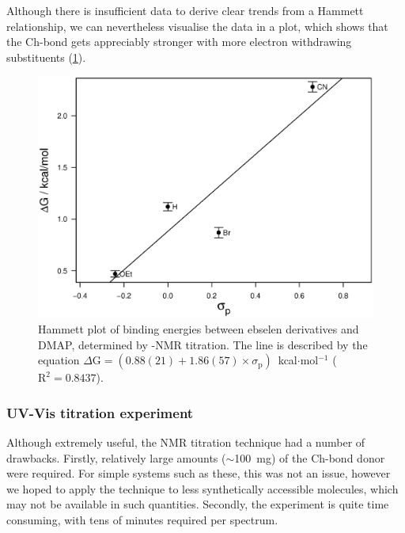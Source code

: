 \begin{refsection}
Although there is insufficient data to derive clear trends from a Hammett relationship, we can nevertheless visualise the data in a plot, which shows that the Ch-bond gets appreciably stronger with more electron withdrawing substituents (\cref{fig:hammett-dmap-nmr}).

\begin{figure}
    \centering
    \includegraphics[width=0.9\linewidth]{Figures/hammett-nmr-p.eps}
    \caption[Hammett plot of binding energies between ebselen derivatives and DMAP.]{Hammett plot of binding energies between ebselen derivatives and DMAP, determined by -NMR titration. The line is described by the equation $\Delta\mathrm{G} = (0.88(21) + 1.86(57) \times \sigma_\text{p})$~kcal$ \cdot $mol$^{-1}$ ($\mathrm{R}^2 = 0.8437$).}\label{fig:hammett-dmap-nmr}
\end{figure}

\subsubsection{UV-Vis titration experiment}
Although extremely useful, the NMR titration technique had a number of drawbacks.
Firstly, relatively large amounts ($\sim$100~mg) of the Ch-bond donor were required.
For simple systems such as these, this was not an issue, however we hoped to apply the technique to less synthetically accessible molecules, which may not be available in such quantities.
Secondly, the experiment is quite time consuming, with tens of minutes required per spectrum.


\end{refsection}
